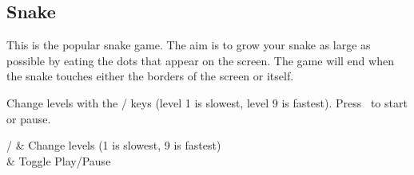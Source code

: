 \subsection{Snake}

This is the popular snake game. The aim is to grow your snake as large
as possible by eating the dots that appear on the screen. The game will
end when the snake touches either the borders of the screen or itself.

Change levels with the \ButtonUp/\ButtonDown{} keys (level 1 is slowest, level 
9 is fastest). Press \ to start or pause.

\begin{table}
    \begin{btnmap}{}{}
    {\ButtonUp/\ButtonDown}
    & Change levels (1 is slowest, 9 is fastest)\\
    & Toggle Play/Pause\\
    \end{btnmap}
\end{table}
